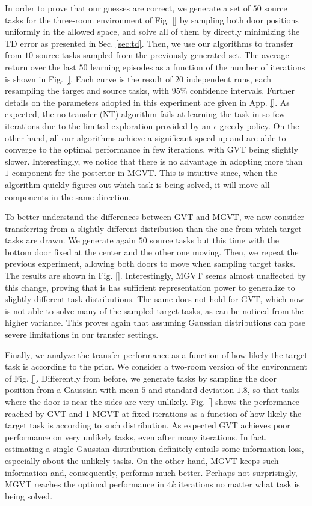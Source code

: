 \documentclass{article}
\begin{document}
In order to prove that our guesses are correct, we generate a set of $50$ source tasks for the three-room environment of Fig. \ref{} by sampling both door positions uniformly in the allowed space, and solve all of them by directly minimizing the TD error as presented in Sec. \ref{sec:td}. Then, we use our algorithms to transfer from $10$ source tasks sampled from the previously generated set. The average return over the last $50$ learning episodes as a function of the number of iterations is shown in Fig. \ref{}. Each curve is the result of $20$ independent runs, each resampling the target and source tasks, with $95\%$ confidence intervals. Further details on the parameters adopted in this experiment are given in App. \ref{}. As expected, the no-transfer (NT) algorithm fails at learning the task in so few iterations due to the limited exploration provided by an $\epsilon$-greedy policy. On the other hand, all our algorithms achieve a significant speed-up and are able to converge to the optimal performance in few iterations, with GVT being slightly slower. Interestingly, we notice that there is no advantage in adopting more than $1$ component for the posterior in MGVT. This is intuitive since, when the algorithm quickly figures out which task is being solved, it will move all components in the same direction.

To better understand the differences between GVT and MGVT, we now consider transferring from a slightly different distribution than the one from which target tasks are drawn. We generate again $50$ source tasks but this time with the bottom door fixed at the center and the other one moving. Then, we repeat the previous experiment, allowing both doors to move when sampling target tasks. The results are shown in Fig. \ref{}. Interestingly, MGVT seems almost unaffected by this change, proving that is has sufficient representation power to generalize to slightly different task distributions. The same does not hold for GVT, which now is not able to solve many of the sampled target tasks, as can be noticed from the higher variance. This proves again that assuming Gaussian distributions can pose severe limitations in our transfer settings.

Finally, we analyze the transfer performance as a function of how likely the target task is according to the prior. We consider a two-room version of the environment of Fig. \ref{}. Differently from before, we generate tasks by sampling the door position from a Gaussian with mean $5$ and standard deviation $1.8$, so that tasks where the door is near the sides are very unlikely. Fig. \ref{} shows the performance reached by GVT and 1-MGVT at fixed iterations as a function of how likely the target task is according to such distribution. As expected GVT achieves poor performance on very unlikely tasks, even after many iterations. In fact, estimating a single Gaussian distribution definitely entails some information loss, especially about the unlikely tasks. On the other hand, MGVT keeps such information and, consequently, performs much better. Perhaps not surprisingly, MGVT reaches the optimal performance in $4k$ iterations no matter what task is being solved.
\end{document}
